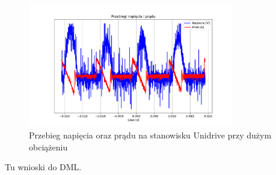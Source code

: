 \documentclass[11pt]{article}
\begin{document}
\begin{figure}[H]
\centering
\includegraphics[width=0.8\textwidth]{aun1_dml_obciazenie_hard.pdf}
\caption{Przebieg napięcia oraz prądu na stanowisku Unidrive przy dużym obciążeniu}
\end{figure}

Tu wnioski do DML.\\
\end{document}
